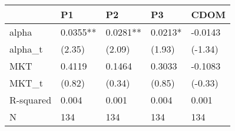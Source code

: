 \begin{tabular}{lllll}
\toprule
 & P1 & P2 & P3 & CDOM \\
\midrule
alpha & 0.0355** & 0.0281** & 0.0213* & -0.0143 \\
alpha_t & (2.35) & (2.09) & (1.93) & (-1.34) \\
MKT & 0.4119 & 0.1464 & 0.3033 & -0.1083 \\
MKT_t & (0.82) & (0.34) & (0.85) & (-0.33) \\
R-squared & 0.004 & 0.001 & 0.004 & 0.001 \\
N & 134 & 134 & 134 & 134 \\
\bottomrule
\end{tabular}
